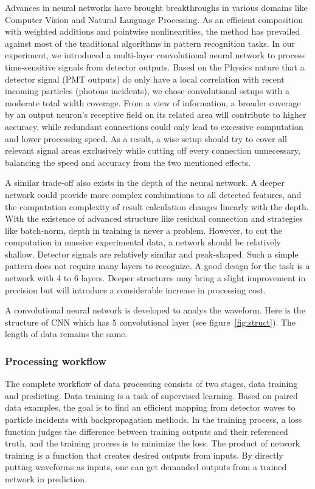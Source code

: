 Advances in neural networks have brought breakthroughs in various domains like Computer Vision and Natural Language Processing. As an efficient composition with weighted additions and pointwise nonlinearities, the method has prevailed against most of the traditional algorithms in pattern recognition tasks. In our experiment, we introduced a multi-layer convolutional neural network to process time-sensitive signals from detector outputs. Based on the Physics nature that a detector signal (PMT outputs) do only have a local correlation with recent incoming particles (photons incidents), we chose convolutional setups with a moderate total width coverage. From a view of information, a broader coverage by an output neuron's receptive field on its related area will contribute to higher accuracy, while redundant connections could only lead to excessive computation and lower processing speed. As a result, a wise setup should try to cover all relevant signal areas exclusively while cutting off every connection unnecessary, balancing the speed and accuracy from the two mentioned effects.

A similar trade-off also exists in the depth of the neural network. A deeper network could provide more complex combinations to all detected features, and the computation complexity of result calculation changes linearly with the depth. With the existence of advanced structure like residual connection and strategies like batch-norm, depth in training is never a problem. However, to cut the computation in massive experimental data, a network should be relatively shallow. Detector signals are relatively similar and peak-shaped. Such a simple pattern does not require many layers to recognize. A good design for the task is a network with 4 to 6 layers. Deeper structures may bring a slight improvement in precision but will introduce a considerable increase in processing cost.

A convolutional neural network is developed to analys the waveform. Here is the structure of CNN which has 5 convolutional layer (see figure~\ref{fig:struct}). The length of data remains the same. 

\subsubsection{Processing workflow}
The complete workflow of data processing consists of two stages, data training and predicting. Data training is a task of supervised learning.  Based on paired data examples, the goal is to find an efficient mapping from detector waves to particle incidents with backpropagation methods. In the training process, a loss function judges the difference between training outputs and their referenced truth, and the training process is to minimize the loss. The product of network training is a function that creates desired outputs from inputs. By directly putting waveforms as inputs, one can get demanded outputs from a trained network in prediction.


